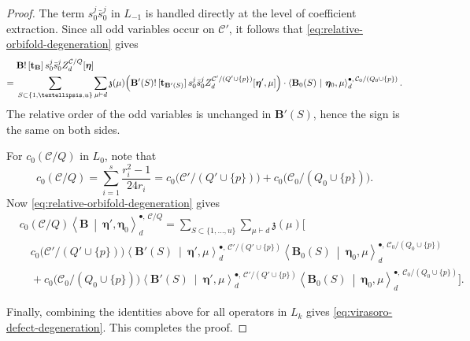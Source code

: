 \documentclass[10pt,a4paper]{amsart}
\newcommand{\cC}{\mathcal C}
\begin{document}
\begin{proof}
The term \(s^j_0\bar s^j_0\) in \(L_{-1}\) is handled directly at the
level of coefficient extraction.  Since all odd
variables occur on \(\cC'\), it follows that \eqref{eq:relative-orbifold-degeneration} gives
\[
\begin{aligned}
&\mathbf B!\,[\mathbf t_{\mathbf B}]\,s^j_0\bar s^j_0
 Z_d^{\cC/Q}[\boldsymbol\eta]
\\
={}&\sum_{S\subset\{1,\ldots,u\}}\sum_{\mu\vdash d}\mathfrak z(\mu)
 \Bigl(\mathbf B'(S)!\,[\mathbf t_{\mathbf B'(S)}]\,s^j_0\bar s^j_0
 Z_d^{\cC'/(Q'\cup\{p\})}[\boldsymbol\eta',\mu]\Bigr)\cdot
 \left\langle\mathbf B_0(S)\ \middle|\ \boldsymbol\eta_0,\mu\right\rangle_d^{\bullet,\,\cC_0/(Q_0\cup\{p\})}.
\end{aligned}
\]
The relative order of the odd variables is unchanged in
\(\mathbf B'(S)\),
hence the sign is the same on both sides.



For $c_0(\cC/Q)$ in $L_0$, note that
\[
c_0(\cC/Q)
=\sum_{i=1}^{s}\frac{r_i^2-1}{24r_i}
=c_0\bigl(\cC'/(Q'\cup\{p\})\bigr)
+c_0\bigl(\cC_0/(Q_0\cup\{p\})\bigr).
\]
Now  \eqref{eq:relative-orbifold-degeneration} gives
\[
\begin{aligned}
&c_0(\cC/Q)
 \left\langle\mathbf B\ \middle|\ \boldsymbol\eta',\boldsymbol\eta_0
 \right\rangle_d^{\bullet,\,\cC/Q}
={}\sum_{S\subset\{1,\ldots,u\}}\sum_{\mu\vdash d}\mathfrak z(\mu)\Bigg[
\\[-2mm]
&\quad c_0\bigl(\cC'/(Q'\cup\{p\})\bigr)
 \left\langle\mathbf B'(S)\ \middle|\ \boldsymbol\eta',\mu\right\rangle_d^{\bullet,\,\cC'/(Q'\cup\{p\})}
 \left\langle\mathbf B_0(S)\ \middle|\ \boldsymbol\eta_0,\mu\right\rangle_d^{\bullet,\,\cC_0/(Q_0\cup\{p\})}
\\[-1mm]
&\quad+c_0\bigl(\cC_0/(Q_0\cup\{p\})\bigr)
 \left\langle\mathbf B'(S)\ \middle|\ \boldsymbol\eta',\mu\right\rangle_d^{\bullet,\,\cC'/(Q'\cup\{p\})}
 \left\langle\mathbf B_0(S)\ \middle|\ \boldsymbol\eta_0,\mu\right\rangle_d^{\bullet,\,\cC_0/(Q_0\cup\{p\})}\Bigg].
\end{aligned}
\]


Finally, combining the identities above for all operators in \(L_k\) gives
\eqref{eq:virasoro-defect-degeneration}. This completes the proof.
\end{proof}
\end{document}
